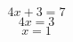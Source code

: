\documentclass{article}
\begin{document}
\section{}
$$4x + 3 = 7
$$$$4x = 3
$$$$x = 1
$$
\end{document}
